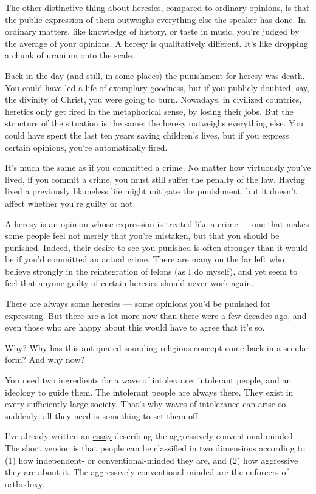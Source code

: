 The other distinctive thing about heresies, compared to ordinary
opinions, is that the public expression of them outweighs everything
else the speaker has done. In ordinary matters, like knowledge of
history, or taste in music, you're judged by the average of your
opinions. A heresy is qualitatively different. It's like dropping a
chunk of uranium onto the scale.

Back in the day (and still, in some places) the punishment for heresy
was death. You could have led a life of exemplary goodness, but if you
publicly doubted, say, the divinity of Christ, you were going to burn.
Nowadays, in civilized countries, heretics only get fired in the
metaphorical sense, by losing their jobs. But the structure of the
situation is the same: the heresy outweighs everything else. You could
have spent the last ten years saving children's lives, but if you
express certain opinions, you're automatically fired.

It's much the same as if you committed a crime. No matter how virtuously
you've lived, if you commit a crime, you must still suffer the penalty
of the law. Having lived a previously blameless life might mitigate the
punishment, but it doesn't affect whether you're guilty or not.

A heresy is an opinion whose expression is treated like a crime --- one
that makes some people feel not merely that you're mistaken, but that
you should be punished. Indeed, their desire to see you punished is
often stronger than it would be if you'd committed an actual crime.
There are many on the far left who believe strongly in the reintegration
of felons (as I do myself), and yet seem to feel that anyone guilty of
certain heresies should never work again.

There are always some heresies --- some opinions you'd be punished for
expressing. But there are a lot more now than there were a few decades
ago, and even those who are happy about this would have to agree that
it's so.

Why? Why has this antiquated-sounding religious concept come back in a
secular form? And why now?

You need two ingredients for a wave of intolerance: intolerant people,
and an ideology to guide them. The intolerant people are always there.
They exist in every sufficiently large society. That's why waves of
intolerance can arise so suddenly; all they need is something to set
them off.

I've already written an \href{conformism.html}{essay} describing the
aggressively conventional-minded. The short version is that people can
be classified in two dimensions according to (1) how independent- or
conventional-minded they are, and (2) how aggressive they are about it.
The aggressively conventional-minded are the enforcers of orthodoxy.

